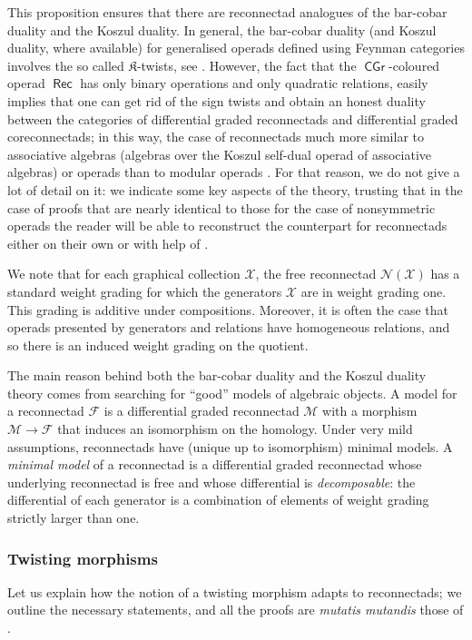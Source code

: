 \documentclass[11pt]{article}
\theoremstyle{definition}
\numberwithin{equation}{section}
\newcommand\calF{\mathcal{F}}
\newcommand\calM{\mathcal{M}}
\newcommand\calN{\mathcal{N}}
\newcommand\calX{\mathcal{X}}
\DeclareMathOperator{\CGr}{\mathsf{CGr}}
\DeclareMathOperator{\Rec}{\mathsf{Rec}}
\begin{document}
This proposition ensures that there are reconnectad analogues of the bar-cobar duality and the Koszul duality. In general, the bar-cobar duality (and Koszul duality, where available) for generalised operads defined using Feynman categories involves the so called $\mathfrak{K}$-twists, see \cite{MR3636409}. However, the fact that the $\CGr$-coloured operad $\Rec$ has only binary operations and only quadratic relations, easily implies that one can get rid of the sign twists and obtain an honest duality between the categories of differential graded reconnectads and differential graded coreconnectads; in this way, the case of reconnectads much more similar to associative algebras (algebras over the Koszul self-dual operad of associative algebras) or operads \cite{VanDerLaan03} than to modular operads \cite{DSVV,MR4425832}. For that reason, we do not give a lot of detail on it: we indicate some key aspects of the theory, trusting that in the case of proofs that are nearly identical to those for the case of nonsymmetric operads the reader will be able to reconstruct the counterpart for reconnectads either on their own or with help of \cite{MR2954392}.  

We note that for each graphical collection $\calX$, the free reconnectad $\calN(\calX)$ has a standard weight grading for which the generators $\calX$ are in weight grading one. This grading is additive under compositions. Moreover, it is often the case that operads presented by generators and relations have homogeneous relations, and so there is an induced weight grading on the quotient. 

The main reason behind both the bar-cobar duality and the Koszul duality theory comes from searching for ``good'' models of algebraic objects. A model for a reconnectad $\calF$ is a differential graded reconnectad $\calM$ with a morphism $\calM\to\calF$ that induces an isomorphism on the homology. Under very mild assumptions, reconnectads have (unique up to isomorphism) minimal models. A \emph{minimal model} of a reconnectad is a differential graded reconnectad whose underlying reconnectad is free and whose differential is \emph{decomposable}: the differential of each generator is a combination of elements of weight grading strictly larger than one.

\subsubsection{Twisting morphisms}

Let us explain how the notion of a twisting morphism adapts to reconnectads; we outline the necessary statements, and all the proofs are \emph{mutatis mutandis} those of \cite[Sec.~6.4]{MR2954392}. 
\end{document}
